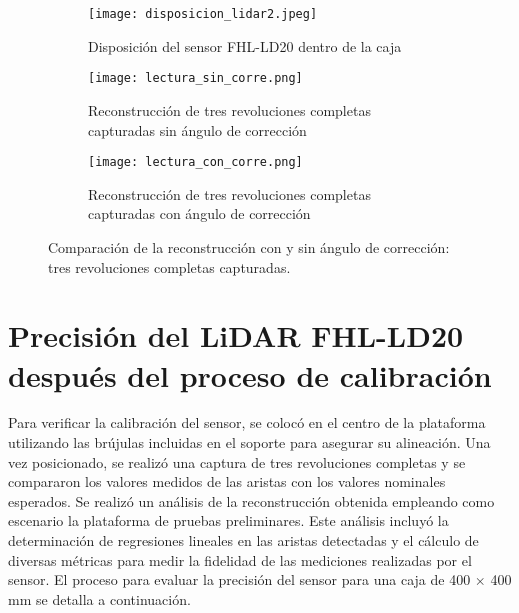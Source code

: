 \begin{figure}[H]
	\centering
	\begin{subfigure}{0.6\textwidth}
		\centering
		\texttt{[image: disposicion\_lidar2.jpeg]}
		\caption{Disposición del sensor FHL-LD20 dentro de la caja}
		\label{disposicion_lidar2}
		\vspace{1em}
	\end{subfigure}
	\begin{subfigure}{0.45\textwidth}
		\centering
		\texttt{[image: lectura\_sin\_corre.png]}
		\caption{Reconstrucción de tres revoluciones completas capturadas sin ángulo de corrección}
		\label{lectura_sin_corre}
	\end{subfigure}
	\hspace{1em}
	\begin{subfigure}{0.45\textwidth}
		\centering
		\texttt{[image: lectura\_con\_corre.png]}
		\caption{Reconstrucción de tres revoluciones completas capturadas con ángulo de corrección}
		\label{lectura_con_corre}
	\end{subfigure}
	\caption{Comparación de la reconstrucción con y sin ángulo de corrección: tres revoluciones completas capturadas.}
	\label{fig: comparación_con_sin_corre}
\end{figure}

\section{Precisión del LiDAR FHL-LD20 después del proceso de calibración}
Para verificar la calibración del sensor, se colocó en el centro de la plataforma utilizando las brújulas incluidas en el soporte para asegurar su alineación. Una vez posicionado, se realizó una captura de tres revoluciones completas y se compararon los valores medidos de las aristas con los valores nominales esperados. Se realizó un análisis de la reconstrucción obtenida empleando como escenario la plataforma de pruebas preliminares. Este análisis incluyó la determinación de regresiones lineales en las aristas detectadas y el cálculo de diversas métricas para medir la fidelidad de las mediciones realizadas por el sensor. El proceso para evaluar la precisión del sensor para una caja de 400 $\times$ 400 mm se detalla a continuación.

